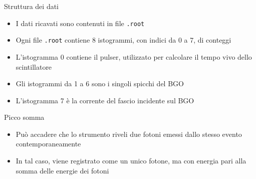 \documentclass [xcolor=svgnames] {beamer}
\begin{document}
\begin{frame}{Struttura dei dati}
	\begin{itemize}
			\item I dati ricavati sono contenuti in file \texttt{.root}
			\item Ogni file \texttt{.root} contiene 8 istogrammi, con indici da 0 a 7, di conteggi
			\item L'istogramma 0 contiene il pulser, utilizzato per calcolare il tempo vivo dello scintillatore
			\item Gli istogrammi da 1 a 6 sono i singoli spicchi del BGO
			\item L'istogramma 7 è la corrente del fascio incidente sul BGO
		\end{itemize}
\end{frame}

\begin{frame}{Picco somma}
	\begin{itemize}
		\item Può accadere che lo strumento riveli due fotoni emessi dallo stesso evento contemporaneamente
		\item In tal caso, viene registrato come un unico fotone, ma con energia pari alla somma delle energie dei fotoni 
	\end{itemize}
\end{frame}
\end{document}
